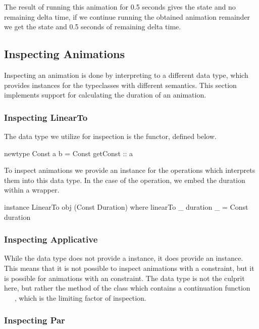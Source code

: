 The result of running this animation for 0.5 seconds gives the state  and no remaining delta time, if we continue running the obtained animation remainder we get the state  and 0.5 seconds of remaining delta time.

\subsection{Inspecting Animations}

Inspecting an animation is done by interpreting \dsl{} to a different data type, which provides instances for the typeclasses with different semantics. This section implements support for calculating the duration of an animation.

\subsubsection{Inspecting LinearTo}

The data type we utilize for inspection is the  functor, defined below.

\begin{spec}
newtype Const a b = Const { getConst :: a }
\end{spec}

To inspect animations we provide an instance for the operations which interprets them into this data type. In the case of the  operation, we embed the duration within a  wrapper.

\begin{code}
instance LinearTo obj (Const Duration) where
  linearTo _ duration _ = Const duration
\end{code}

\subsubsection{Inspecting Applicative}

While the  data type does not provide a  instance, it does provide an  instance. This means that it is not possible to inspect animations with a  constraint, but it is possible for animations with an  constraint. The  data type is not the culprit here, but rather the \hs{>>=} method of the  class which contains a continuation function ~\hs{->}~~, which is the limiting factor of inspection.

\subsubsection{Inspecting Par}

